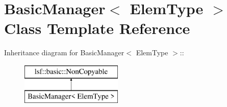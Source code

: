 \hypertarget{classBasicManager}{
\section{BasicManager$<$ ElemType $>$ Class Template Reference}
\label{classBasicManager}
}
Inheritance diagram for BasicManager$<$ ElemType $>$::\begin{figure}[H]
\begin{center}
\leavevmode
\includegraphics[height=2cm]{classBasicManager}
\end{center}
\end{figure}
